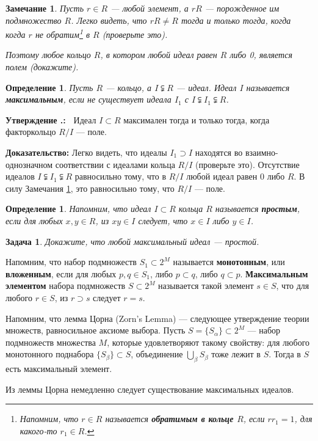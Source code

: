 \documentclass[12pt]{book}
\def\endproof{\hbox{\vrule width 5pt height 5pt depth 0pt}}
\theoremstyle{upshape}
\newtheorem{zadacha}{Задача}[chapter]
\theoremstyle{generic}
\newtheorem{opredelenie}[teorema]{Определение}
\newtheorem{remark}[teorema]{Замечание}
\def\замечание{\begin{remark}}
\def\еза{\end{remark}}
\theoremstyle{upshapenonumber}
\newtheorem{ukazanie}{Указание}[section]
\newcommand{\следствие}{%
     \refstepcounter{teorema}
     {\noindent\bf Следствие \thechapter.\arabic{teorema}:\ }}
\newcommand{\пример}{%
     \refstepcounter{teorema}
     {\noindent\bf Пример \thechapter.\arabic{teorema}:\ }}
\newcommand{\лемма}{%
     \refstepcounter{teorema}
     {\noindent\bf Лемма \thechapter.\arabic{teorema}:\ }}
\newcommand{\теорема}{%
     \refstepcounter{teorema}
     {\noindent\bf Теорема \thechapter.\arabic{teorema}:\ }}
\newcommand{\утверждение}{%
     \refstepcounter{teorema}
     {\noindent\bf Утверждение \thechapter.\arabic{teorema}:\ }}
\def\хфилл{\hfill}
\def\ноиндент{\noindent}
\def\бф{\bf}
\def\ем{\em}
\def\задача{\begin{zadacha}}
\def\ез{\end{zadacha}}
\def\указание{\begin{ukazanie}}
\def\еу{\end{ukazanie}}
\def\определение{\begin{opredelenie}}
\def\ео{\end{opredelenie}}
\def\енум{\begin{enumerate}}
\def\ее{\end{enumerate}}
\begin{document}
\замечание \label{_bez_idea_pole_Zamechanie_}
Пусть $r\in R$ --- любой элемент, а $r R$ --- порожденное
им подмножество $R$. Легко видеть, что $rR\neq R$ 
тогда и только тогда, когда когда $r$ не 
обратим\footnote{Напомним, что $r\in R$ называется
{\бф обратимым в кольце $R$}, если $rr_1 =1$, для
какого-то $r_1 \in R$.} в $R$ (проверьте это).

Поэтому любое кольцо $R$, в котором любой идеал
равен $R$ либо 0, является полем (докажите).
\еза

\определение
Пусть $R$ --- кольцо, а $I\subsetneqq R$ --- идеал.
Идеал $I$ называется {\бф максимальным}, 
если не существует идеала $I_1$ с 
$I \subsetneqq I_1 \subsetneqq R$.
\ео

\утверждение
Идеал $I\subset R$ максимален тогда и только тогда,
когда факторкольцо $R/I$ --- поле.

\хфилл

\ноиндент
{\бф Доказательство:} Легко видеть, что идеалы 
$I_1 \supset I$ находятся во вза\-им\-но-\-од\-нозначном
соответствии с идеалами кольца $R/I$ (проверьте это). 
Отсутствие идеалов  $I \subsetneqq I_1 \subsetneqq R$
равносильно тому, что в  $R/I$ любой
идеал равен 0 либо $R$. В силу 
Замечания \ref{_bez_idea_pole_Zamechanie_},
это равносильно тому, что $R/I$ --- поле.
\endproof


\определение
Напомним, что идеал $I \subset R$ кольца $R$ называется 
{\бф простым}, если для любых $x, y\in R$, из
$xy\in I$ следует, что $x\in I$ либо $y\in I$.
\ео

\задача
Докажите, что любой максимальный идеал --- простой.
\ез


Напомним, что набор подмножеств $S_1 \subset 2^M$
называется  {\бф монотонным}, или {\бф вложенным}, если для любых
$p, q \in S_1$, либо $p\subset q$,
либо $q \subset p$. {\бф Максимальным
элементом} набора подмножеств $S \subset 2^M$
называется такой  элемент $s\in S$, что для любого 
$r\in S$, из $r \supset s$ следует 
$r=s$.

Напомним, что лемма Цорна (Zorn's Lemma) --- следующее
утверждение теории множеств, равносильное аксиоме выбора.
Пусть $S=\{S_\alpha\}\subset 2^M$ --- набор подмножеств множества $M$,
которые удовлетворяют такому свойству: для любого
монотонного поднабора $\{S_\beta\}\subset S$, объединение
$\bigcup_\beta S_\beta$ тоже лежит в $S$. Тогда в $S$
есть максимальный элемент.

Из леммы Цорна немедленно следует существование
максимальных идеалов.

\hfill
\end{document}
